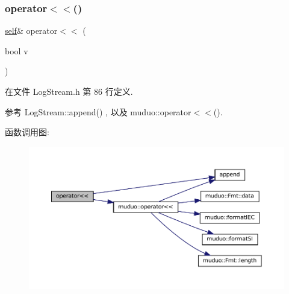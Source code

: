 \mbox{\label{classmuduo_1_1LogStream_a00bf7c971fab473cfa7dd9cd23aaa955}} 
\subsubsection{\texorpdfstring{operator$<$$<$()}{operator<<()}\hspace{0.1cm}{\footnotesize\ttfamily [1/18]}}
{\footnotesize\ttfamily \hyperlink{classmuduo_1_1LogStream_a85e87a809801549b949fc3f7f8c816bd}{self}\& operator$<$$<$ (\begin{DoxyParamCaption}\item[{bool}]{v }\end{DoxyParamCaption})\hspace{0.3cm}{\ttfamily [inline]}}



在文件 Log\+Stream.\+h 第 86 行定义.



参考 Log\+Stream\+::append() , 以及 muduo\+::operator$<$$<$().

函数调用图\+:
\nopagebreak
\begin{figure}[H]
\begin{center}
\leavevmode
\includegraphics[width=350pt]{classmuduo_1_1LogStream_a00bf7c971fab473cfa7dd9cd23aaa955_cgraph}
\end{center}
\end{figure}
\mbox{\label{classmuduo_1_1LogStream_af71df134185fc4377c2951e98856f40c}} 
